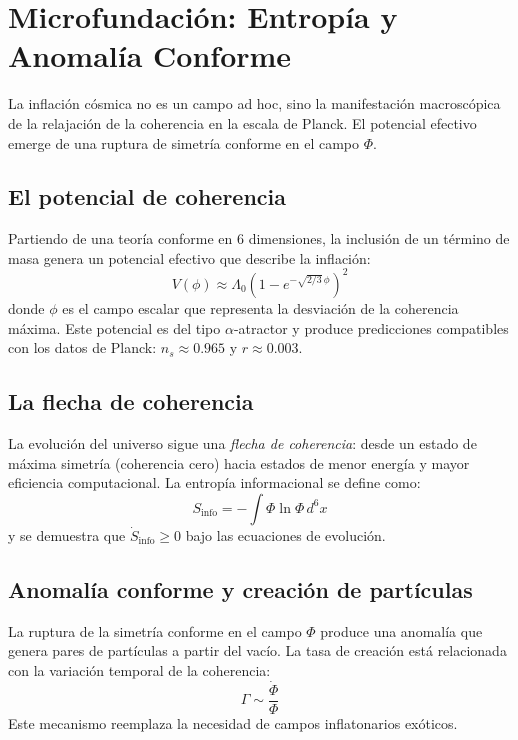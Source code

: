 \chapter{Microfundación: Entropía y Anomalía Conforme}
La inflación cósmica no es un campo ad hoc, sino la manifestación macroscópica de la relajación de la coherencia en la escala de Planck. El potencial efectivo emerge de una ruptura de simetría conforme en el campo $\Phi$.

\section{El potencial de coherencia}
Partiendo de una teoría conforme en 6 dimensiones, la inclusión de un término de masa genera un potencial efectivo que describe la inflación:
\begin{equation}
V(\phi) \approx \Lambda_0 \left(1 - e^{-\sqrt{2/3}\,\phi}\right)^2
\end{equation}
donde $\phi$ es el campo escalar que representa la desviación de la coherencia máxima. Este potencial es del tipo $\alpha$-atractor y produce predicciones compatibles con los datos de Planck: $n_s \approx 0.965$ y $r \approx 0.003$.

\section{La flecha de coherencia}
La evolución del universo sigue una \emph{flecha de coherencia}: desde un estado de máxima simetría (coherencia cero) hacia estados de menor energía y mayor eficiencia computacional. La entropía informacional se define como:
\begin{equation}
S_{\text{info}} = -\int \Phi \ln \Phi \, d^6x
\end{equation}
y se demuestra que $\dot{S}_{\text{info}} \geq 0$ bajo las ecuaciones de evolución.

\section{Anomalía conforme y creación de partículas}
La ruptura de la simetría conforme en el campo $\Phi$ produce una anomalía que genera pares de partículas a partir del vacío. La tasa de creación está relacionada con la variación temporal de la coherencia:
\begin{equation}
\Gamma \sim \frac{\dot{\Phi}}{\Phi}
\end{equation}
Este mecanismo reemplaza la necesidad de campos inflatonarios exóticos.
